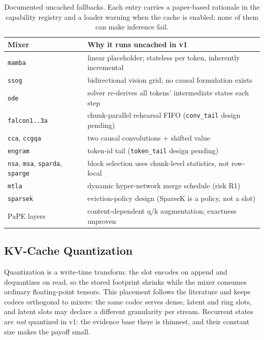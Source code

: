 \begin{table}[H]
\centering
\small
\begin{tabularx}{0.98\linewidth}{l X}
\toprule
\textbf{Mixer} & \textbf{Why it runs uncached in v1} \\
\midrule
\texttt{mamba} & linear placeholder; stateless per token, inherently incremental \\
\texttt{ssog} & bidirectional vision grid; no causal formulation exists \\
\texttt{ode} & solver re-derives all tokens' intermediate states each step \\
\texttt{falcon1..3a} & chunk-parallel rehearsal FIFO (\texttt{conv\_tail} design pending) \\
\texttt{cca}, \texttt{ccgqa} & two causal convolutions + shifted value \\
\texttt{engram} & token-id tail (\texttt{token\_tail} design pending) \\
\texttt{nsa}, \texttt{msa}, \texttt{sparda}, \texttt{sparge} & block selection uses chunk-level statistics, not row-local \\
\texttt{mtla} & dynamic hyper-network merge schedule (risk R1) \\
\texttt{sparsek} & eviction-policy design (SparseK is a policy, not a slot) \\
PaPE layers & content-dependent q/k augmentation; exactness unproven \\
\bottomrule
\end{tabularx}
\caption{Documented uncached fallbacks. Each entry carries a paper-based rationale in the capability registry and a loader warning when the cache is enabled; none of them can make inference fail.}
\label{tab:kv-fallbacks}
\end{table}

\subsection{KV-Cache Quantization}
\label{sec:kv-quant}

Quantization is a write-time transform: the slot encodes on append and dequantizes on read, so the stored footprint shrinks while the mixer consumes ordinary floating-point tensors. This placement follows the literature and keeps codecs orthogonal to mixers: the same codec serves dense, latent and ring slots, and latent slots may declare a different granularity per stream. Recurrent states are \emph{not} quantized in v1: the evidence base there is thinnest, and their constant size makes the payoff small.

